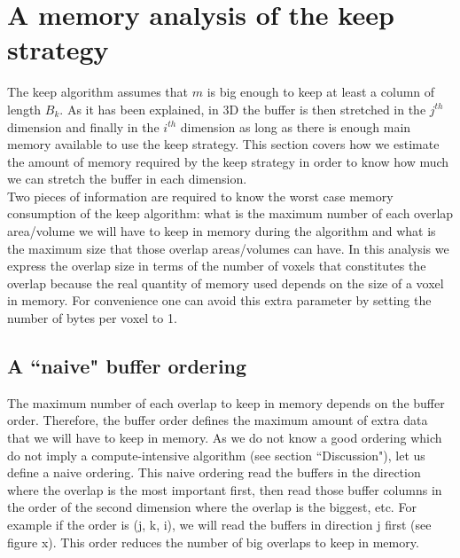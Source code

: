 \documentclass[conference]{IEEEtran}
\begin{document}
\section*{A memory analysis of the keep strategy}
The keep algorithm assumes that $m$ is big enough to keep at least a column of length $B_k$. %
As it has been explained, in 3D the buffer is then stretched in the $j^{th}$ dimension and finally in the $i^{th}$ dimension as long as there is enough main memory available to use the keep strategy.
This section covers how we estimate the amount of memory required by the keep strategy in order to know how much we can stretch the buffer in each dimension. \\

Two pieces of information are required to know the worst case memory consumption of the keep algorithm: what is the maximum number of each overlap area/volume we will have to keep in memory during the algorithm and what is the maximum size that those overlap areas/volumes can have.
In this analysis we express the overlap size in terms of the number of voxels that constitutes the overlap because the real quantity of memory used depends on the size of a voxel in memory.
For convenience one can avoid this extra parameter by setting the number of bytes per voxel to 1.

\subsection{A ``naive" buffer ordering}
The maximum number of each overlap to keep in memory depends on the buffer order.
Therefore, the buffer order defines the maximum amount of extra data that we will have to keep in memory.
As we do not know a good ordering which do not imply a compute-intensive algorithm (see section ``Discussion"), let us define a naive ordering.
This naive ordering read the buffers in the direction where the overlap is the most important first, then read those buffer columns in the order of the second dimension where the overlap is the biggest, etc.
For example if the order is (j, k, i), we will read the buffers in direction j first (see figure x).
This order reduces the number of big overlaps to keep in memory. \\
\end{document}
